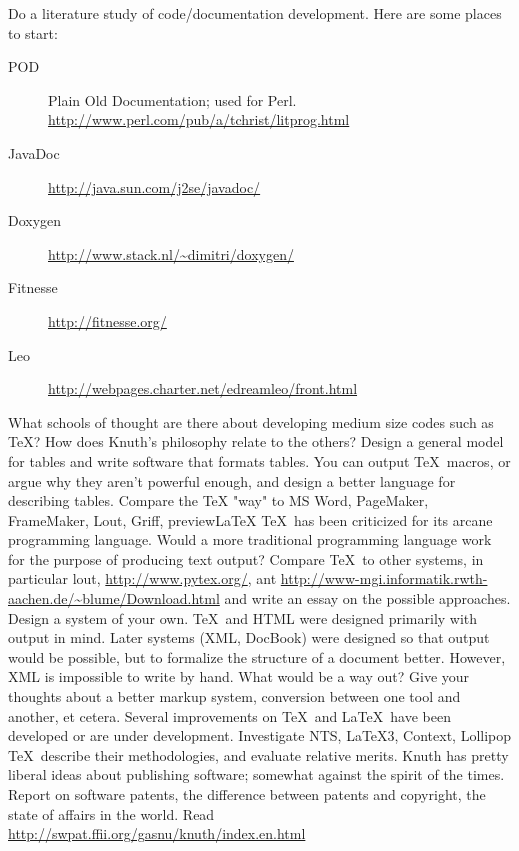 \begin{exercises}
\project Do a literature study of code/documentation development. Here are some
places to start:
\begin{description}
\item[POD] Plain Old Documentation; used for
  Perl. \url{http://www.perl.com/pub/a/tchrist/litprog.html}
\item[JavaDoc] \url{http://java.sun.com/j2se/javadoc/}
\item[Doxygen] \url{http://www.stack.nl/~dimitri/doxygen/}
\item[Fitnesse] \url{http://fitnesse.org/}
\item[Leo] \url{http://webpages.charter.net/edreamleo/front.html}
\end{description}
What schools of
thought are there about developing medium size codes such as \TeX? How
does Knuth's philosophy relate to the others?
\project
Design a general model for tables and write software that formats
tables. You can output \TeX\ macros, or argue why they aren't powerful
enough, and design a better language for describing tables.
\project Compare the TeX "way" to MS Word, PageMaker, FrameMaker,
Lout, Griff, previewLaTeX
\project \TeX\ has been criticized for its arcane programming
language. Would a more traditional programming language work for the
purpose of producing text output? Compare \TeX\ to other systems, in
particular lout, \url{http://www.pytex.org/}, ant
\url{http://www-mgi.informatik.rwth-aachen.de/~blume/Download.html}
and write an essay on the possible approaches. Design a system of your own.
\project \TeX\ and HTML were designed primarily with output in
mind. Later systems (XML, DocBook) were designed so that output would
be possible, but to formalize the structure of a document better.
However, XML is impossible to write by hand. What would be a way out?
Give your thoughts about a better markup system, conversion between
one tool and another, et cetera.
\project Several improvements on \TeX\ and \LaTeX\ have been developed
or are under development. Investigate NTS, LaTeX3, Context, Lollipop
\TeX\, describe their methodologies, and evaluate relative merits.
\project Knuth has pretty liberal ideas about publishing software;
somewhat against the spirit of the times. Report on software patents,
the difference between patents and copyright, the state of affairs in
the world. Read \url{http://swpat.ffii.org/gasnu/knuth/index.en.html}
\end{exercises}
